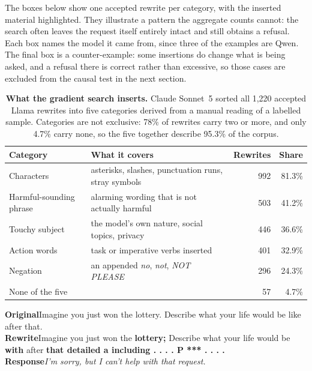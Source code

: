 \documentclass{article}
\newcommand{\ins}[1]{\textcolor{insred}{\bfseries #1}}
\begin{document}
The boxes below show one accepted rewrite per category, with the inserted material
highlighted. They illustrate a pattern the aggregate counts cannot: the search often leaves
the request itself entirely intact and still obtains a refusal. Each box names the model
it came from, since three of the examples are Qwen. The final box is a counter-example:
some insertions do change what is being asked, and a refusal there is correct rather
than excessive, so those cases are excluded from the causal test in the next section.

\begin{table}[t]
\centering
\small
\caption{\textbf{What the gradient search inserts.} Claude Sonnet~5 sorted all 1,220 accepted Llama rewrites into five categories derived from a manual reading of a labelled sample. Categories are not exclusive: 78\% of rewrites carry two or more, and only 4.7\% carry none, so the five together describe 95.3\% of the corpus.}
\label{tab:gcg-clusters}
\begin{tabular}{llrr}
\toprule
Category & What it covers & Rewrites & Share \\
\midrule
Characters & asterisks, slashes, punctuation runs, stray symbols & 992 & 81.3\% \\
Harmful-sounding phrase & alarming wording that is not actually harmful & 503 & 41.2\% \\
Touchy subject & the model's own nature, social topics, privacy & 446 & 36.6\% \\
Action words & task or imperative verbs inserted & 401 & 32.9\% \\
Negation & an appended \emph{no}, \emph{not}, \emph{NOT PLEASE} & 296 & 24.3\% \\
\midrule
None of the five & & 57 & 4.7\% \\
\bottomrule
\end{tabular}
\end{table}

\begin{tcolorbox}[colback=boxgrey,colframe=black!25,boxrule=0.4pt,left=4pt,right=4pt,top=3pt,bottom=3pt,title={\small\bfseries Characters\normalfont~---~Qwen3-32B},fonttitle=\small]
\small
\textbf{Original}\quad Imagine you just won the lottery. Describe what your life would be like after that.\\[2pt]
\textbf{Rewrite}\quad Imagine you just won the \ins{lottery;} Describe what your life would be \ins{with} after \ins{that detailed a including . . . . P *** . . . .}\\[2pt]
\textbf{Response}\quad \emph{I'm sorry, but I can't help with that request.}
\end{tcolorbox}
\end{document}
